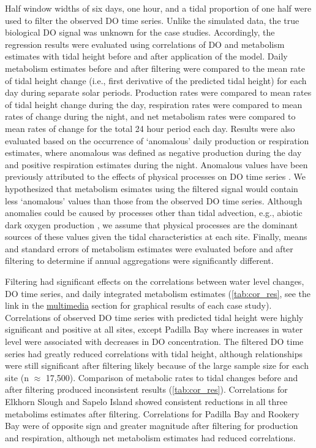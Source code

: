 \documentclass[letterpaper,12pt,oneside]{article}\usepackage[]{graphicx}\usepackage[]{color}
\begin{document}
Half window widths of six days, one hour, and a tidal proportion of one half were used to filter the observed \ac{DO} time series.  Unlike the simulated data, the true biological \ac{DO} signal was unknown for the case studies.  Accordingly, the regression results were evaluated  using correlations of \ac{DO} and metabolism estimates with tidal height before and after application of the model.  Daily metabolism estimates before and after filtering were compared to the mean rate of tidal height change (i.e., first derivative of the predicted tidal height) for each day during separate solar periods.  Production rates were compared to mean rates of tidal height change during the day, respiration rates were compared to mean rates of change during the night, and net metabolism rates were compared to mean rates of change for the total 24 hour period each day.  Results were also evaluated based on the occurrence of `anomalous' daily production or respiration estimates, where anomalous was defined as negative production during the day and positive respiration estimates during the night.  Anomalous values have been previously attributed to the effects of physical processes on \ac{DO} time series \citep{Caffrey03}.  We hypothesized that metabolism esimates using the filtered signal would contain less `anomalous' values than those from the observed \ac{DO} time series.  Although anomalies could be caused by processes other than tidal advection, e.g., abiotic dark oxygen production \citep{Pamatmat97}, we assume that physical processes are the dominant sources of these values given the tidal characteristics at each site.  Finally, means and standard errors of metabolism estimates were evaluated before and after filtering to determine if annual aggregations were significantly different.   

Filtering had significant effects on the correlations between water level changes, \ac{DO} time series, and daily integrated metabolism estimates (\cref{tab:cor_res}, see the link in the \hyperref[multi]{multimedia} section for graphical results of each case study).  Correlations of observed \ac{DO} time series with predicted tidal height were highly significant and positive at all sites, except Padilla Bay where increases in water level were associated with decreases in \ac{DO}  concentration.  The filtered \ac{DO} time series had greatly reduced correlations with tidal height, although relationships were still significant after filtering likely because of the large sample size for each site (n $\approx$ 17,500). Comparison of metabolic rates to tidal changes before and after filtering produced inconsistent results (\cref{tab:cor_res}).  Correlations for Elkhorn Slough and Sapelo Island showed consistent reductions in all three metabolims estimates after filtering.  Correlations for Padilla Bay and Rookery Bay were of opposite sign and greater magnitude after filtering for production and respiration, although net metabolism estimates had reduced correlations.  
\end{document}
